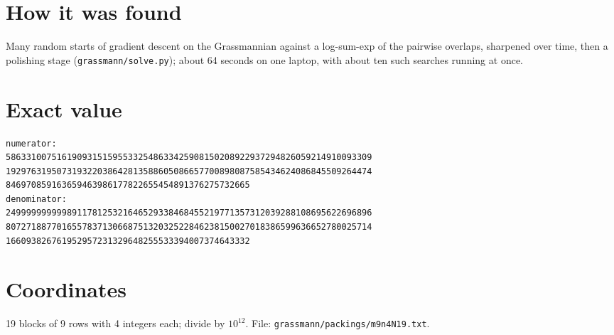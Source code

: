 \documentclass[11pt,a4paper]{article}
\begin{document}
\section{How it was found}
Many random starts of gradient descent on the Grassmannian against a log-sum-exp of the pairwise overlaps, sharpened over time, then a polishing stage (\texttt{grassmann/solve.py}); about 64 seconds on one laptop, with about ten such searches running at once.


\appendix
\section{Exact value}
{\small
\begin{verbatim}
numerator:
586331007516190931515955332548633425908150208922937294826059214910093309
192976319507319322038642813588605086657700898087585434624086845509264474
846970859163659463986177822655454891376275732665
denominator:
249999999999891178125321646529338468455219771357312039288108695622696896
807271887701655783713066875132032522846238150027018386599636652780025714
166093826761952957231329648255533394007374643332
\end{verbatim}}

\section{Coordinates}
19 blocks of 9 rows with 4 integers each; divide by $10^{12}$. File: \texttt{grassmann/packings/m9n4N19.txt}.
{\tiny
\begin{multicols}{3}
\end{multicols}}
\end{document}
